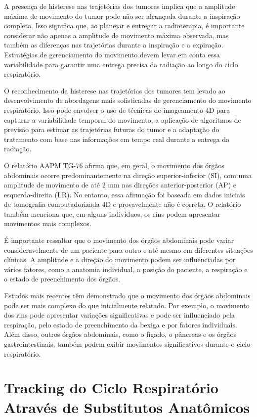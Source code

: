 \documentclass[11pt,a4paper]{article}
\newcounter{exemplo}
\begin{document}
	A presença de histerese nas trajetórias dos tumores implica que a amplitude máxima de movimento do tumor pode não ser alcançada durante a inspiração completa. Isso significa que, ao planejar e entregar a radioterapia, é importante considerar não apenas a amplitude de movimento máxima observada, mas também as diferenças nas trajetórias durante a inspiração e a expiração. Estratégias de gerenciamento do movimento devem levar em conta essa variabilidade para garantir uma entrega precisa da radiação ao longo do ciclo respiratório.

	O reconhecimento da histerese nas trajetórias dos tumores tem levado ao desenvolvimento de abordagens mais sofisticadas de gerenciamento do movimento respiratório. Isso pode envolver o uso de técnicas de imageamento 4D para capturar a variabilidade temporal do movimento, a aplicação de algoritmos de previsão para estimar as trajetórias futuras do tumor e a adaptação do tratamento com base nas informações em tempo real durante a entrega da radiação.

	O relatório AAPM TG-76 afirma que, em geral, o movimento dos órgãos abdominais ocorre predominantemente na direção superior-inferior (SI), com uma amplitude de movimento de até 2 mm nas direções anterior-posterior (AP) e esquerda-direita (LR). No entanto, essa afirmação foi baseada em dados iniciais de tomografia computadorizada 4D e provavelmente não é correta. O relatório também menciona que, em alguns indivíduos, os rins podem apresentar movimentos mais complexos.

	É importante ressaltar que o movimento dos órgãos abdominais pode variar consideravelmente de um paciente para outro e até mesmo em diferentes situações clínicas. A amplitude e a direção do movimento podem ser influenciadas por vários fatores, como a anatomia individual, a posição do paciente, a respiração e o estado de preenchimento dos órgãos.

	Estudos mais recentes têm demonstrado que o movimento dos órgãos abdominais pode ser mais complexo do que inicialmente relatado. Por exemplo, o movimento dos rins pode apresentar variações significativas e pode ser influenciado pela respiração, pelo estado de preenchimento da bexiga e por fatores individuais. Além disso, outros órgãos abdominais, como o fígado, o pâncreas e os órgãos gastrointestinais, também podem exibir movimentos significativos durante o ciclo respiratório.

\section{Tracking do Ciclo Respiratório Através de Substitutos Anatômicos}
\end{document}
